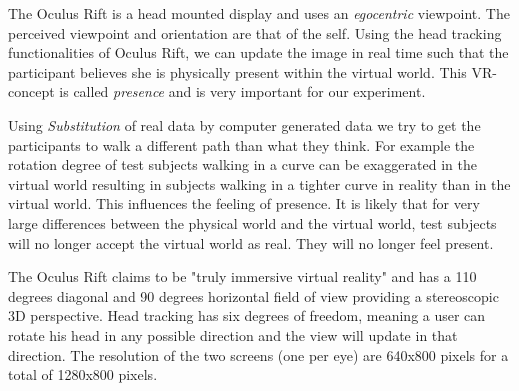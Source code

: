 The Oculus Rift is a head mounted display and uses an \textit{egocentric} viewpoint. 
The perceived viewpoint and orientation are that of the self.
Using the head tracking functionalities of Oculus Rift, we can update the image in real time such that the participant believes she is physically present within the virtual world.
This VR-concept is called \textit{presence} and is very important for our experiment.

Using \textit{Substitution} of real data by computer generated data we try to get the participants to walk a different path than what they think. 
For example the rotation degree of test subjects walking in a curve can be exaggerated in the virtual world resulting in subjects walking in a tighter curve in reality than in the virtual world.
This influences the feeling of presence. 
It is likely that for very large differences between the physical world and the virtual world, test subjects will no longer accept the virtual world as real.
They will no longer feel present.

The Oculus Rift claims to be "truly immersive virtual reality" and has a 110 degrees diagonal and 90 degrees horizontal field of view providing a stereoscopic 3D perspective.
Head tracking has six degrees of freedom, meaning a user can rotate his head in any possible direction and the view will update in that direction.
The resolution of the two screens (one per eye) are 640x800 pixels for a total of 1280x800 pixels.
